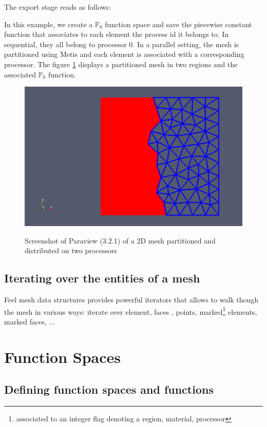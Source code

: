 \documentclass[a4paper]{book}
\newcommand{\polyP}[1]{\ensuremath{\mathbb{P}_{#1}}\xspace}
\newcommand{\feel}{Feel\xspace}
\begin{document}
The export stage reads as follows:



In this example, we create a $\polyP{0}$ function space and save the
piecewise constant function that associates to each element the
process id it belongs to. In sequential, they all belong to processor
0.  In a parallel setting, the mesh is partitioned using Metis and
each element is associated with a corresponding processor. The figure
\ref{fig:1} displays a partitioned mesh in two regions and the
associated $\polyP{0}$ function.

\begin{figure}[htbp]
  \centering
  \includegraphics[width=.7\linewidth]{mymeshpartition}
  \label{fig:1}
  \caption{Screenshot of Paraview (3.2.1) of a 2D mesh partitioned and distributed on two processors}
\end{figure}


\subsection{Iterating over the entities of a mesh}

\feel mesh data structures provides powerful iterators that allows to
walk though the mesh in various ways: iterate over element, faces ,
points, marked\footnote{associated to an integer flag denoting a
  region, material, processor} elements, marked faces, ...



\section{Function Spaces}
\label{sec:function-spaces}

\subsection{Defining function spaces and functions}
\end{document}
